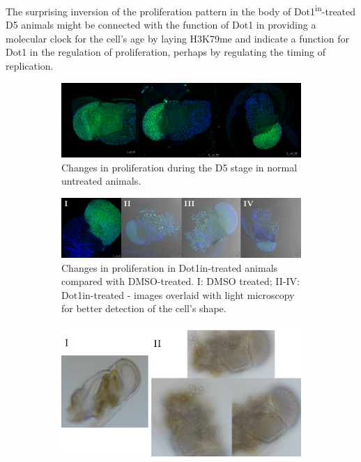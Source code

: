 \documentclass[11pt,twoside,a4paper]{report}
\begin{document}
	The surprising inversion of the proliferation pattern in the body of 	Dot1\textsuperscript{in}-treated D5 animals might be connected with the function of Dot1 in providing a molecular clock for the cell's age by laying H3K79me and indicate a function for Dot1 in the regulation of proliferation, perhaps by regulating the timing of replication.
	
	\begin{figure}[h!]
		\setlength{\belowcaptionskip}{5pt}
		\centering
		\begin{subfigure}{1\textwidth}
			\centering
			\includegraphics[width=1\linewidth]{pngs/d5_EdU.png}
			\caption{Changes in proliferation during the D5 stage in normal untreated animals.}
		\end{subfigure}
		\begin{subfigure}{1\textwidth}
			\centering
			\includegraphics[width=1\linewidth]{pngs/D5_EdU_dot1in.png}
			\caption{
				Changes in proliferation in Dot1in-treated animals compared with DMSO-treated.
				{\footnotesize
					I: DMSO treated;
					II-IV: Dot1in-treated - images overlaid with light microscopy for better detection of the cell's shape.
				}
			}
		\end{subfigure}
		\begin{subfigure}{0.8\textwidth}
			\centering
			\includegraphics[width=1\linewidth]{pngs/d5_phenotype.png}

\end{subfigure}
\end{figure}
\end{document}
